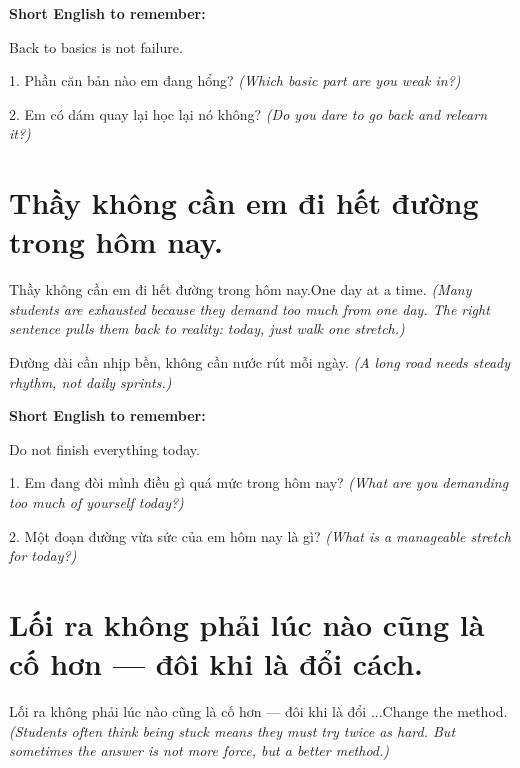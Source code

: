 \begin{ghinhoanh}
\textbf{Short English to remember:}

Back to basics is not failure.

\end{ghinhoanh}

\begin{tuhocnhanh}
1. Phần căn bản nào em đang hổng? \textit{(Which basic part are you weak in?)}

2. Em có dám quay lại học lại nó không? \textit{(Do you dare to go back and relearn it?)}
\end{tuhocnhanh}
\ngancach


\section{Thầy không cần em đi hết đường trong hôm nay.}
\begin{truyen}{Thầy không cần em đi hết đường trong hôm nay.}{One day at a time.}
\textit{(Many students are exhausted because they demand too much from one day. The right sentence pulls them back to reality: today, just walk one stretch.)}
\end{truyen}

\begin{baihoc}
Đường dài cần nhịp bền, không cần nước rút mỗi ngày.
\textit{(A long road needs steady rhythm, not daily sprints.)}
\end{baihoc}

\begin{ghinhoanh}
\textbf{Short English to remember:}

Do not finish everything today.

\end{ghinhoanh}

\begin{tuhocnhanh}
1. Em đang đòi mình điều gì quá mức trong hôm nay? \textit{(What are you demanding too much of yourself today?)}

2. Một đoạn đường vừa sức của em hôm nay là gì? \textit{(What is a manageable stretch for today?)}
\end{tuhocnhanh}
\ngancach


\section{Lối ra không phải lúc nào cũng là cố hơn — đôi khi là đổi cách.}
\begin{truyen}{Lối ra không phải lúc nào cũng là cố hơn — đôi khi là đổi ...}{Change the method.}
\textit{(Students often think being stuck means they must try twice as hard. But sometimes the answer is not more force, but a better method.)}
\end{truyen}

